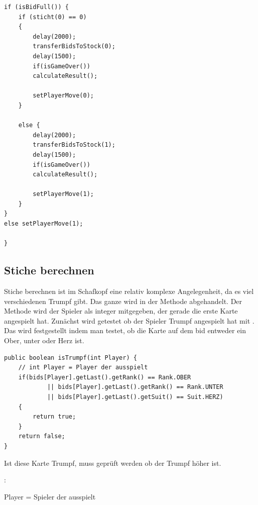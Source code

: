 \begin{lstlisting}[caption={initPlayers gamecycle},captionpos=b]
if (isBidFull()) {
    if (sticht(0) == 0)
    {
        delay(2000);
        transferBidsToStock(0);
        delay(1500);
        if(isGameOver())
        calculateResult();

        setPlayerMove(0);
    }

    else {
        delay(2000);
        transferBidsToStock(1);
        delay(1500);
        if(isGameOver())
        calculateResult();

        setPlayerMove(1);
    }
}
else setPlayerMove(1);

}
\end{lstlisting}

\subsection{Stiche berechnen}

Stiche berechnen ist im Schafkopf eine relativ komplexe Angelegenheit, da es
viel verschiedenen Trumpf gibt. Das ganze wird in der Methode  abgehandelt. Der Methode wird der Spieler als integer mitgegeben, der
gerade die erste Karte angespielt hat. Zunächst wird getestet ob der Spieler
Trumpf angespielt hat mit . Das wird festgestellt
indem man  testet, ob die Karte auf dem bid entweder ein Ober, unter oder Herz
ist.

\begin{lstlisting}[caption={isTrumpf Methode},captionpos=b]
public boolean isTrumpf(int Player) {
    // int Player = Player der ausspielt
    if(bids[Player].getLast().getRank() == Rank.OBER
            || bids[Player].getLast().getRank() == Rank.UNTER
            || bids[Player].getLast().getSuit() == Suit.HERZ)
    {
        return true;
    }
    return false;
}
\end{lstlisting}

Ist diese Karte Trumpf, muss geprüft werden ob der Trumpf höher ist. 

: 

Player = Spieler der ausspielt

